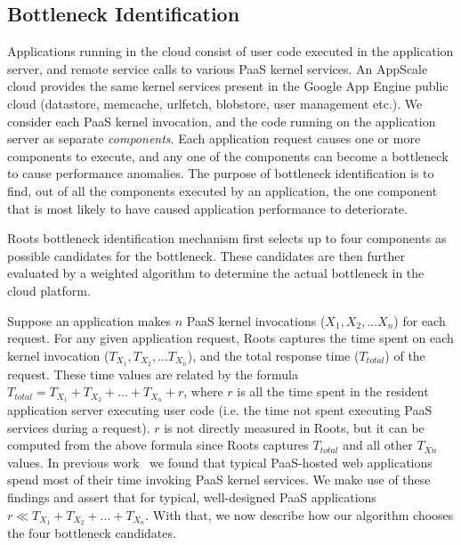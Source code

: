 \subsection{Bottleneck Identification}


Applications running in the cloud consist of user code executed in the application server, 
and remote service calls to various PaaS kernel services. An AppScale cloud
provides the same kernel services present in the Google App Engine public cloud (datastore, memcache,
urlfetch, blobstore, user management etc.).
We consider each PaaS kernel invocation, and the code running on the application server as 
separate \textit{components}. Each application request causes one or more components to
execute, and any one of the components can become a bottleneck to cause performance anomalies.  
The purpose of bottleneck identification is to find, out of all
the components executed by an application, the one component that is most likely to have caused 
application performance to deteriorate.

Roots bottleneck identification mechanism first
selects up to four components as possible candidates
for the bottleneck. These candidates are then further evaluated by a weighted algorithm to
determine the actual bottleneck in the cloud platform.

Suppose an application makes $n$ PaaS kernel invocations ($X_1, X_2, ... X_n$) for each request. 
For any given application request,
Roots captures the time spent on each kernel invocation ($T_{X_1}, T_{X_2}, ... T_{X_n}$), and the 
total response time ($T_{total}$) of the request. These time values are related by the formula
$T_{total} = T_{X_1} + T_{X_2} + ... + T_{X_n} + r$, where $r$ is all the time spent in the resident 
application server executing user code (i.e. the time not
spent executing PaaS services during a request). $r$ is not
directly measured in Roots, but it can be computed from the above formula 
since Roots captures $T_{total}$ and all other $T_{Xn}$ values. In previous
work~\cite{Jayathilaka:2015:RTS:2806777.2806842} we found that typical
PaaS-hosted web applications spend most of their time invoking PaaS kernel services.
We make use of these findings and assert that for typical,
well-designed PaaS applications $r \ll T_{X_1} + T_{X_2} + ... + T_{X_n}$.
With that, we now describe how our algorithm chooses the four bottleneck candidates.

